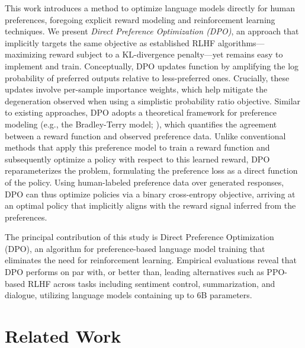 This work introduces a method to optimize language models directly for human preferences, foregoing explicit reward modeling and reinforcement learning techniques. We present \textit{Direct Preference Optimization (DPO)}, an approach that implicitly targets the same objective as established RLHF algorithms—maximizing reward subject to a KL-divergence penalty—yet remains easy to implement and train. Conceptually, DPO updates function by amplifying the log probability of preferred outputs relative to less-preferred ones. Crucially, these updates involve per-sample importance weights, which help mitigate the degeneration observed when using a simplistic probability ratio objective. Similar to existing approaches, DPO adopts a theoretical framework for preference modeling (e.g., the Bradley-Terry model; \cite{bradley1952rankanalysis}), which quantifies the agreement between a reward function and observed preference data. Unlike conventional methods that apply this preference model to train a reward function and subsequently optimize a policy with respect to this learned reward, DPO reparameterizes the problem, formulating the preference loss as a direct function of the policy. Using human-labeled preference data over generated responses, DPO can thus optimize policies via a binary cross-entropy objective, arriving at an optimal policy that implicitly aligns with the reward signal inferred from the preferences.

The principal contribution of this study is Direct Preference Optimization (DPO), an algorithm for preference-based language model training that eliminates the need for reinforcement learning. Empirical evaluations reveal that DPO performs on par with, or better than, leading alternatives such as PPO-based RLHF across tasks including sentiment control, summarization, and dialogue, utilizing language models containing up to 6B parameters.

\section{Related Work}

